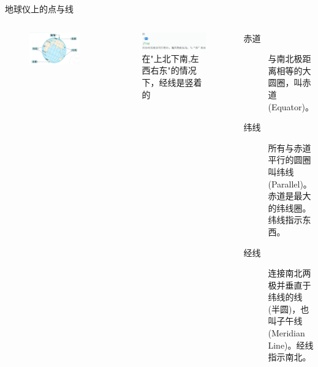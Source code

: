 \documentclass[10pt]{ctexbeamer}
\begin{document}
    \begin{frame}{地球仪上的点与线}
        \begin{columns}
            \begin{figure}
                \includegraphics[width=.99\textwidth]{assets/little earth.png}
            \end{figure}
            \begin{figure}[c]
                \includegraphics[width=.89\textwidth]{assets/jing.png}
                \caption{在"上北下南,左西右东"的情况下，\alert{经线是竖着的}}
            \end{figure}
            
            \begin{description}
                \item[赤道] 与南北极距离相等的大圆圈，叫赤道(Equator)。\\
                \item[纬线] 所有与赤道平行的\alert{圆圈}叫纬线(Parallel)。赤道是最大的纬线圈。纬线指示东西。\\
                \item[经线] 连接南北两极并垂直于纬线的线(\alert{半圆})，也叫\alert{子午线(Meridian Line)}。经线指示南北。
            \end{description}
        \end{columns}
    \end{frame}
\end{document}
